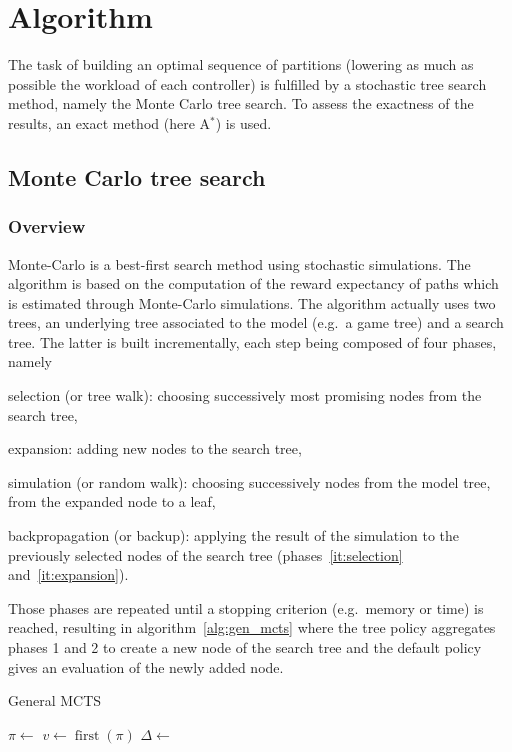 \documentclass[oneside,twocolumn]{article}
\DeclareMathOperator{\first}{first}
\begin{document}
\section{Algorithm}

The task of building an optimal sequence of partitions (lowering
as much as possible the workload of each controller) is fulfilled by a
stochastic tree search method, namely the Monte Carlo tree search. To assess the
exactness of the results, an exact method (here A\(^*\)) is used.

\subsection{Monte Carlo tree search}
\subsubsection{Overview}\label{sssec:overview}
Monte-Carlo is a best-first search method using stochastic simulations. The
algorithm is based on the computation of the reward expectancy of paths which
is estimated through Monte-Carlo simulations.
The
algorithm actually uses two trees, an underlying tree associated to the model
(e.g.\ a game tree) and a search tree. The latter is built incrementally, each
step being composed of four phases, namely
\begin{compactenum}
\item\label{it:selection} selection (or tree walk): choosing successively
  most promising nodes from the search tree,
\item\label{it:expansion} expansion: adding new nodes to the search tree,
\item simulation (or random walk): choosing successively nodes from the model
  tree, from the expanded node to a leaf,
\item backpropagation (or backup): applying the result of the simulation to
  the previously selected nodes of the search tree (phases~\ref{it:selection}
  and~\ref{it:expansion}).
\end{compactenum}
Those phases are repeated until a stopping criterion (e.g.\ memory or time) is
reached, resulting in algorithm~\ref{alg:gen_mcts} where the tree policy
aggregates phases 1 and 2 to create a new node of the search tree and the
default policy gives an evaluation of the newly added node.
\begin{algorithm}
  \caption{General MCTS~\cite{browne2012survey}}\label{alg:gen_mcts}
  \begin{algorithmic}
    \State{}\(\pi \gets\) 
    \State{}\(v \gets \first(\pi)\)
    \State{}\(\Delta \gets\) 
    \State{}
    \EndWhile{}
    \EndProcedure{}
  \end{algorithmic}
\end{algorithm}
\end{document}
